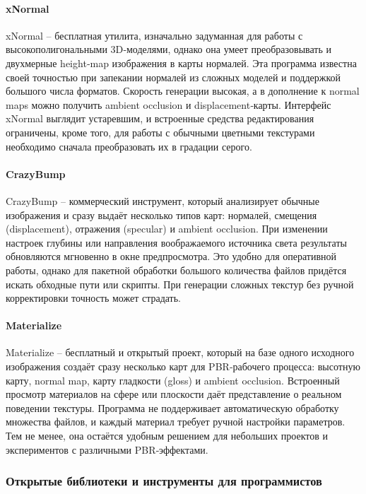 \paragraph{xNormal}

xNormal -- бесплатная утилита, изначально задуманная для работы с высокополигональными 3D‑моделями, однако она умеет преобразовывать и двухмерные height‑map изображения в карты нормалей. Эта программа известна своей точностью при запекании нормалей из сложных моделей и поддержкой большого числа форматов. Скорость генерации высокая, а в дополнение к normal maps можно получить ambient occlusion и displacement‑карты. Интерфейс xNormal выглядит устаревшим, и встроенные средства редактирования ограничены, кроме того, для работы с обычными цветными текстурами необходимо сначала преобразовать их в градации серого.
\paragraph{CrazyBump}

CrazyBump -- коммерческий инструмент, который анализирует обычные изображения и сразу выдаёт несколько типов карт: нормалей, смещения (displacement), отражения (specular) и ambient occlusion. При изменении настроек глубины или направления воображаемого источника света результаты обновляются мгновенно в окне предпросмотра. Это удобно для оперативной работы, однако для пакетной обработки большого количества файлов придётся искать обходные пути или скрипты. При генерации сложных текстур без ручной корректировки точность может страдать.
\paragraph{Materialize}

Materialize -- бесплатный и открытый проект, который на базе одного исходного изображения создаёт сразу несколько карт для PBR‑рабочего процесса: высотную карту, normal map, карту гладкости (gloss) и ambient occlusion. Встроенный просмотр материалов на сфере или плоскости даёт представление о реальном поведении текстуры. Программа не поддерживает автоматическую обработку множества файлов, и каждый материал требует ручной настройки параметров. Тем не менее, она остаётся удобным решением для небольших проектов и экспериментов с различными PBR‑эффектами.
\subsubsection{Открытые библиотеки и инструменты для программистов}
